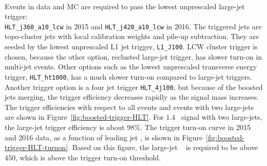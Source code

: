 \paragraph{}
Events in data and MC are required to pass the lowest unprescaled large-\R jet trigger: \\
\verb|HLT_j360_a10_lcw| in 2015 and \verb|HLT_j420_a10_lcw| in 2016. 
The triggered jets are topo-cluster jets with local calibration weights and pile-up subtraction.
They are seeded by the lowest unprescaled L1 jet trigger, \texttt{L1\_J100}. 
LCW cluster trigger is chosen, because the other option, reclusted large-\R jet trigger, has slower turn-on in multi-jet events. 
Other options such as the lowest unprescaled transverse energy trigger, \verb|HLT_ht1000|, has a much slower turn-on compared to large-\R jet triggers.
Another trigger option is a four jet trigger \verb|HLT_4j100|, but because of the boosted jets merging, the trigger efficiency decreases rapidly as the signal mass increases. 
The trigger efficiencies with respect to all events and events with two large-\R jets are shown in Figure~\ref{fig:boosted-trigger-HLT}.
For $1.4$\TeV~ signal with two large-\R jets, the large-\R jet trigger efficiency is about $98\%$.
The trigger turn-on curve in 2015 and 2016 data, as a function of leading jet \pt, is shown in Figure~\ref{fig:boosted-trigger-HLT-turnon}.
Based on this figure, the large-\R jet \pt~ is required to be above $450$\GeV, which is above the trigger turn-on threshold.

